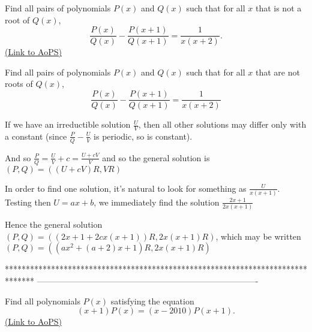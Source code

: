 \begin{problem}
	Find all pairs of polynomials $ P(x)$ and $ Q(x)$ such that for all $ x$ that is not a root of $ Q(x)$,
\[ \frac{P(x)}{Q(x)}-\frac{P(x+1)}{Q(x+1)}=\frac{1}{x(x+2)}.\]
	\flushright \href{https://artofproblemsolving.com/community/c6h334429}{(Link to AoPS)}
\end{problem}



\begin{solution}
	\begin{tcolorbox}Find all pairs of polynomials $ P(x)$ and $ Q(x)$ such that for all $ x$ that are not roots of $ Q(x)$,
\[ \frac {P(x)}{Q(x)} - \frac {P(x + 1)}{Q(x + 1)} = \frac {1}{x(x + 2)}\]
\end{tcolorbox}

If we have an irreductible solution $ \frac UV$, then all other solutions may differ only with a constant (since $ \frac PQ-\frac UV$ is periodic, so is constant).

And so $ \frac PQ=\frac UV+c=\frac{U+cV}V$ and so the general solution is $ (P,Q)=((U+cV)R, VR)$

In order to find one solution, it's natural to look for something as $ \frac U{x(x+1)}$. Testing then $ U=ax+b$, we immediately find the solution $ \frac{2x+1}{2x(x+1)}$

Hence the general solution $ (P,Q)=((2x+1+2cx(x+1))R,2x(x+1)R)$, which may be written $ \boxed{(P,Q)=((ax^2+(a+2)x+1)R,2x(x+1)R)}$
\end{solution}
*******************************************************************************
-------------------------------------------------------------------------------

\begin{problem}
	Find all polynomials $ P(x)$ satisfying the equation
\[(x+1)P(x)=(x-2010)P(x+1).\]
	\flushright \href{https://artofproblemsolving.com/community/c6h335804}{(Link to AoPS)}
\end{problem}



